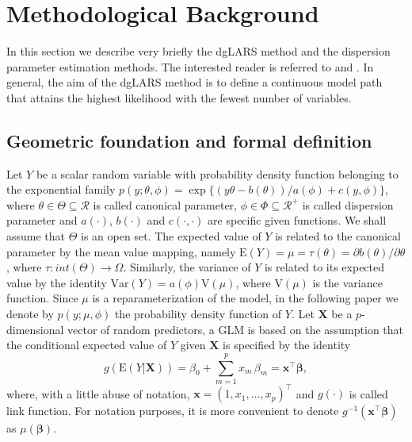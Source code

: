 \section{Methodological Background}
\label{sec:metback}

In this section we describe very briefly the dgLARS method and the dispersion parameter estimation methods. The interested reader is referred to \cite{Augug14a} and \cite{pazira}. In general, the aim of the dgLARS method is to define a continuous model path that attains the highest likelihood with the fewest number of variables.


\subsection[Geometric foundation and formal definition]{Geometric foundation and formal definition}
\label{subsec:dglarsmet}

Let $Y$ be a scalar random variable with probability density function belonging to the exponential family $p(y; \theta,\phi)=\exp\{(y\theta-b(\theta))/a(\phi)+c(y, \phi)\}$, where $\theta \in {\Theta} \subseteq \mathcal{R}$ is called canonical parameter, $\phi \in {\Phi} \subseteq \mathcal{R}^+$ is called dispersion parameter and $a(\cdot)$, $b(\cdot)$ and $c(\cdot,\cdot)$ are specific given functions.
We shall assume that $\Theta$ is an open set. The expected value of $Y$ is related to the canonical parameter by the mean value mapping, namely $\text{E}(Y) = \mu = \tau(\theta) = \partial b(\theta)/\partial \theta$, where $\tau:int(\Theta)\rightarrow\Omega$.
Similarly, the variance of $Y$ is related to its expected value by the identity $\text{Var}(Y) = a(\phi)\text{V}(\mu)$, where $\text{V}(\mu)$ is the variance function. Since $\mu$ is a reparameterization of the model, in the following paper we denote by $p(y; \mu, \phi)$ the probability density function of $Y$. Let $\bm{X}$ be a $p$-dimensional vector of random predictors, a GLM is based on the assumption that the conditional expected value of $Y$ given $\bm{X}$ is specified by the identity
$$
g(\text{E}(Y|\bm{X}))=\beta_0 +\sum_{m=1}^{p} x_m \, \beta_m = \bm x^\top\bm\beta,
$$
where, with a little abuse of notation, $\bm x = (1, x_1, \ldots, x_p)^\top$ and $g(\cdot)$ is called link function. For notation purposes, it is more convenient to denote $g^{-1} (\bm x^\top\bm\beta)$ as $\mu(\bm\beta)$.

